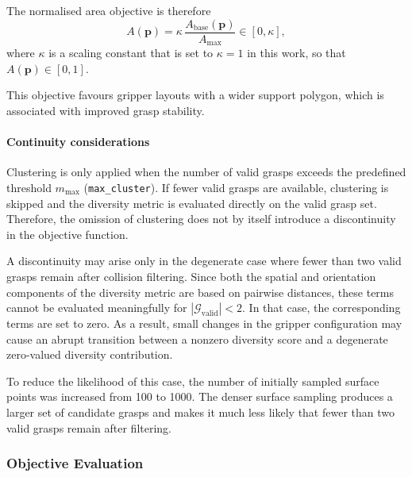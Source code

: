 \begin{enumerate}
The normalised area objective is therefore
\begin{equation}
    A(\mathbf{p}) = \kappa \, \frac{A_{\mathrm{base}}(\mathbf{p})}{A_{\max}}
    \in [0, \kappa],
\end{equation}
where $\kappa$ is a scaling constant that is set to $\kappa = 1$ in this work, so that
$A(\mathbf{p}) \in [0,1]$.

This objective favours gripper layouts with a wider support polygon, which is associated
with improved grasp stability.


\paragraph{Continuity considerations}
Clustering is only applied when the number of valid grasps exceeds the predefined threshold
$m_{\max}$ (\texttt{max\_cluster}). If fewer valid grasps are available, clustering is skipped and
the diversity metric is evaluated directly on the valid grasp set. Therefore, the omission of
clustering does not by itself introduce a discontinuity in the objective function.

A discontinuity may arise only in the degenerate case where fewer than two valid grasps remain after
collision filtering. Since both the spatial and orientation components of the diversity metric are
based on pairwise distances, these terms cannot be evaluated meaningfully for $|\mathcal{G}_{\mathrm{valid}}|<2$. In that case,
the corresponding terms are set to zero. As a result, small changes in the gripper configuration may
cause an abrupt transition between a nonzero diversity score and a degenerate zero-valued diversity
contribution.

To reduce the likelihood of this case, the number of initially sampled surface points was increased
from 100 to 1000. The denser surface sampling produces a larger set of candidate grasps and makes it
much less likely that fewer than two valid grasps remain after filtering.
\end{enumerate}
\subsubsection{Objective Evaluation}

